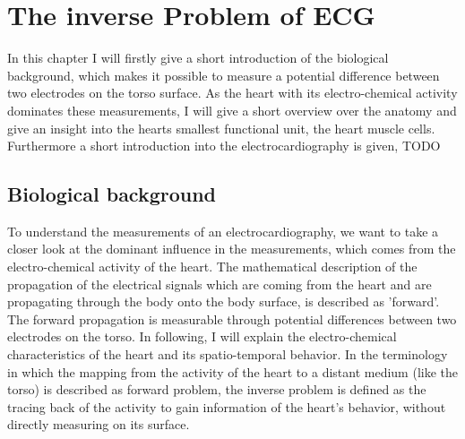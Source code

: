 \chapter{The inverse Problem of ECG}
In this chapter I will firstly give a short introduction of the biological background, which makes it possible to measure a potential difference between two electrodes on the torso surface. As the heart with its electro-chemical activity dominates these measurements, I will give a short overview over the anatomy and give an insight into the hearts smallest functional unit, the heart muscle cells. Furthermore a short introduction into the electrocardiography is given, TODO


%


\section{Biological background}
To understand the measurements of an electrocardiography, we want to take a closer look at the dominant influence in the measurements, which comes from the electro-chemical activity of the heart. The mathematical description of the propagation of the electrical signals which are coming from the heart and are propagating through the body onto the body surface, is described as 'forward'. The forward propagation is measurable through potential differences between two electrodes on the torso. In following, I will explain the electro-chemical characteristics of the heart and its spatio-temporal behavior. In the terminology in which the mapping from the activity of the heart to a distant medium (like the torso) is described as forward problem, the inverse problem is defined as the tracing back of the activity to gain information of the heart's behavior, without directly measuring on its surface.

